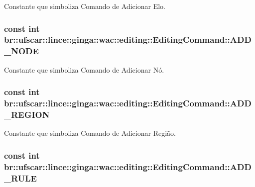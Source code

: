 Constante que simboliza Comando de Adicionar Elo. 

\hypertarget{classbr_1_1ufscar_1_1lince_1_1ginga_1_1wac_1_1editing_1_1EditingCommand_a16171b0dc6db42495b4ebc69b0e71deb}{
\subsubsection[{ADD\_\-NODE}]{\setlength{\rightskip}{0pt plus 5cm}const int {\bf br::ufscar::lince::ginga::wac::editing::EditingCommand::ADD\_\-NODE}}}
\label{classbr_1_1ufscar_1_1lince_1_1ginga_1_1wac_1_1editing_1_1EditingCommand_a16171b0dc6db42495b4ebc69b0e71deb}


Constante que simboliza Comando de Adicionar Nó. 

\hypertarget{classbr_1_1ufscar_1_1lince_1_1ginga_1_1wac_1_1editing_1_1EditingCommand_ae20dc6b5472ef3d2e917e14d05f34632}{
\subsubsection[{ADD\_\-REGION}]{\setlength{\rightskip}{0pt plus 5cm}const int {\bf br::ufscar::lince::ginga::wac::editing::EditingCommand::ADD\_\-REGION}}}
\label{classbr_1_1ufscar_1_1lince_1_1ginga_1_1wac_1_1editing_1_1EditingCommand_ae20dc6b5472ef3d2e917e14d05f34632}


Constante que simboliza Comando de Adicionar Região. 

\hypertarget{classbr_1_1ufscar_1_1lince_1_1ginga_1_1wac_1_1editing_1_1EditingCommand_a02c282a78048b97f4999a74b5914c4a4}{
\subsubsection[{ADD\_\-RULE}]{\setlength{\rightskip}{0pt plus 5cm}const int {\bf br::ufscar::lince::ginga::wac::editing::EditingCommand::ADD\_\-RULE}}}
\label{classbr_1_1ufscar_1_1lince_1_1ginga_1_1wac_1_1editing_1_1EditingCommand_a02c282a78048b97f4999a74b5914c4a4}


